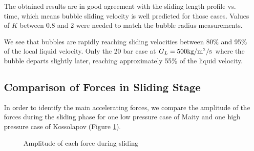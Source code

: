 \npar
The obtained results are in good agreement with the sliding length profile vs. time, which means bubble sliding velocity is well predicted for those cases. Values of $K$ between 0.8 and 2 were needed to match the bubble radius measurements.

\npar

We see that bubbles are rapidly reaching sliding velocities between 80\% and 95\% of the local liquid velocity. Only the 20 bar case at $G_{L}=500\text{kg/m$^{2}$/s}$ where the bubble departs slightly later, reaching approximately 55\% of the liquid velocity.


\subsection{Comparison of Forces in Sliding Stage}

In order to identify the main accelerating forces, we compare the amplitude of the forces during the sliding phase for one low pressure case of Maity and one high pressure case of Kossolapov (Figure \ref{fig:forces_sliding}).


\begin{figure}[h!]
\begin{center}
	\caption{Amplitude of each force during sliding}	
	\label{fig:forces_sliding}
\end{center}
\end{figure}


